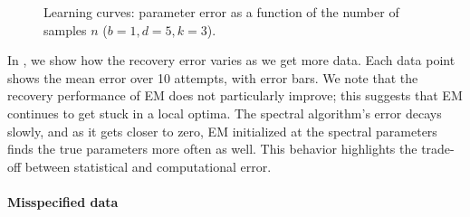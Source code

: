 \begin{figure}[p]
  \centering
    \hspace{-2em}
  \caption{Learning curves: parameter error as a function of the number of samples $n$ ($b = 1, d = 5, k = 3$).}
  \label{fig:vs-n}
\end{figure}

In , we show how the recovery error varies as we get
more data. Each data point shows the mean error over 10 attempts, with
error bars. We note that the recovery performance of EM does not
particularly improve; this suggests that EM continues to get stuck in
a local optima. The spectral algorithm's error decays slowly, and as it
gets closer to zero, EM initialized at the spectral parameters finds the
true parameters more often as well. This behavior highlights the
trade-off between statistical and computational error. 

\paragraph{Misspecified data}

